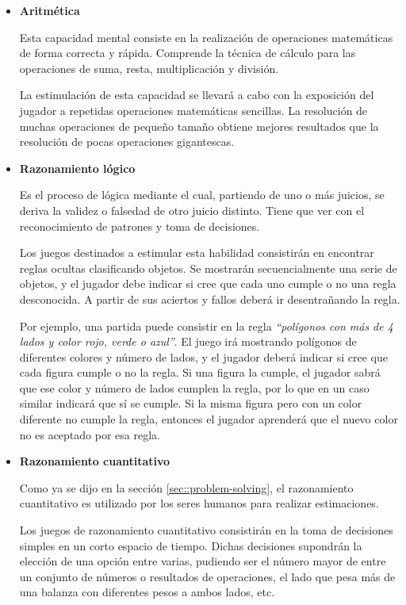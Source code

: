 \begin{itemize}
\item {\bf Aritmética}

Esta capacidad mental consiste en la realización de operaciones matemáticas de forma correcta y rápida. Comprende la técnica de cálculo para las operaciones de suma, resta, multiplicación y división.

La estimulación de esta capacidad se llevará a cabo con la exposición del jugador a repetidas operaciones matemáticas sencillas. La resolución de muchas operaciones de pequeño tamaño obtiene mejores resultados que la resolución de pocas operaciones gigantescas.

\item {\bf Razonamiento lógico}

Es el proceso de lógica mediante el cual, partiendo de uno o más juicios, se deriva la validez o falsedad de otro juicio distinto. Tiene que ver con el reconocimiento de patrones y toma de decisiones.

Los juegos destinados a estimular esta habilidad consistirán en encontrar reglas ocultas clasificando objetos. Se mostrarán secuencialmente una serie de objetos, y el jugador debe indicar si cree que cada uno cumple o no una regla desconocida. A partir de sus aciertos y fallos deberá ir desentrañando la regla.

Por ejemplo, una partida puede consistir en la regla {\it ``polígonos con más de 4 lados y color rojo, verde o azul''}. El juego irá mostrando polígonos de diferentes colores y número de lados, y el jugador deberá indicar si cree que cada figura cumple o no la regla. Si una figura la cumple, el jugador sabrá que ese color y número de lados cumplen la regla, por lo que en un caso similar indicará que sí se cumple. Si la misma figura pero con un color diferente no cumple la regla, entonces el jugador aprenderá que el nuevo color no es aceptado por esa regla.

\item {\bf Razonamiento cuantitativo}

Como ya se dijo en la sección \ref{sec::problem-solving}, el razonamiento cuantitativo es utilizado por los seres humanos para realizar estimaciones.

Los juegos de razonamiento cuantitativo consistirán en la toma de decisiones simples en un corto espacio de tiempo. Dichas decisiones supondrán la elección de una opción entre varias, pudiendo ser el número mayor de entre un conjunto de números o resultados de operaciones, el lado que pesa más de una balanza con diferentes pesos a ambos lados, etc.


\end{itemize}
